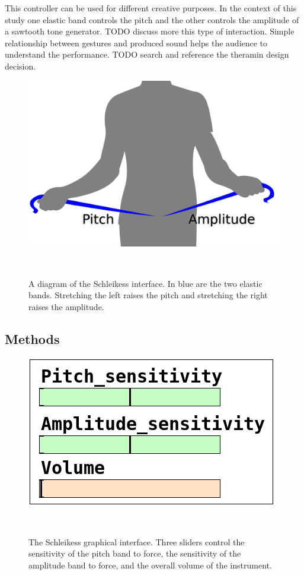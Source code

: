 \documentclass{sigchi}
\begin{document}
This controller can be used for different creative purposes.
In the context of this study one elastic band controls the pitch and the other controls the amplitude of a sawtooth tone generator.
TODO discuss more this type of interaction. Simple relationship between gestures and produced sound helps the audience to understand the performance. TODO search and reference the theramin design decision.

\begin{figure}
  \centering
  \includegraphics[width=0.9\columnwidth]{figures/schleikess}
  \caption{A diagram of the Schleikess interface. In blue are the two elastic bands. Stretching the left raises the pitch and stretching the right raises the amplitude.}~\label{fig:schleikess}
\end{figure}

\subsection{Methods}

\begin{figure}
  \centering
  \includegraphics[width=0.9\columnwidth]{figures/pd_interface}
  \caption{The Schleikess graphical interface. Three sliders control the sensitivity of the pitch band to force, the sensitivity of the amplitude band to force, and the overall volume of the instrument.}~\label{fig:pd-interface}
\end{figure}
\end{document}
